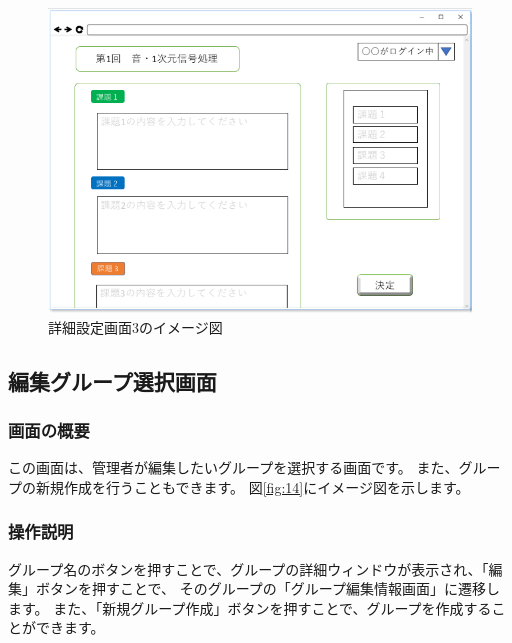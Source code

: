 \begin{figure}[htbp]
  \begin{center}
    \includegraphics[width=1\linewidth,clip]{./img/13.png}
    \caption{詳細設定画面3のイメージ図}\label{fig:13}
  \end{center}
\end{figure}

\newpage

\subsection{編集グループ選択画面}
\subsubsection{画面の概要}
この画面は、管理者が編集したいグループを選択する画面です。
また、グループの新規作成を行うこともできます。
図\ref{fig:14}にイメージ図を示します。

\subsubsection{操作説明}
グループ名のボタンを押すことで、グループの詳細ウィンドウが表示され、「編集」ボタンを押すことで、
そのグループの「グループ編集情報画面」に遷移します。
また、「新規グループ作成」ボタンを押すことで、グループを作成することができます。

